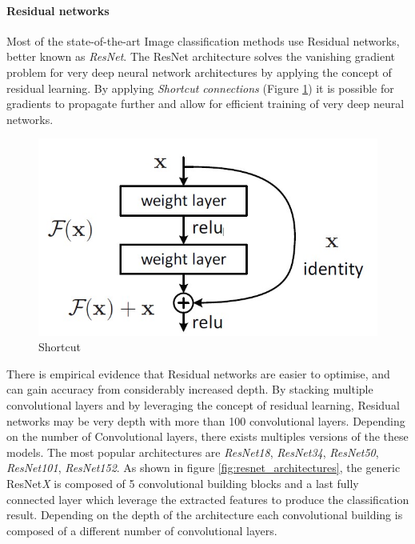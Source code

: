 \paragraph{Residual networks} \label{Residual Networks}

Most of the state-of-the-art Image classification methods use Residual networks, better known as \textit{ResNet}\citep{he2016deep}. The ResNet architecture solves the vanishing gradient problem for very deep neural network architectures by applying the concept of residual learning. By applying \textit{Shortcut connections} (Figure \ref{fig:shortcut}) it is possible for gradients to propagate further and allow for efficient training of very deep neural networks.

\begin{figure}
\centerline{\includegraphics[scale=0.5]{images/chapter_2/residual_learning.jpg}}
\caption{Shortcut \citep{he2016deep}}
\label{fig:shortcut}
\end{figure}

There is empirical evidence that Residual networks are easier to optimise, and can gain accuracy from considerably increased depth. By stacking multiple convolutional layers and by leveraging the concept of residual learning, Residual networks may be very depth with more than 100 convolutional layers. Depending on the number of Convolutional layers, there exists multiples versions of the these models. The most popular architectures are \textit{ResNet18}, \textit{ResNet34}, \textit{ResNet50}, \textit{ResNet101}, \textit{ResNet152}. As shown in figure \ref{fig:resnet_architectures}, the generic ResNet\textit{X} is composed of 5 convolutional building blocks and a last fully connected layer which leverage the extracted features to produce the classification result. Depending on the depth of the architecture each convolutional building is composed of a different number of convolutional layers.

